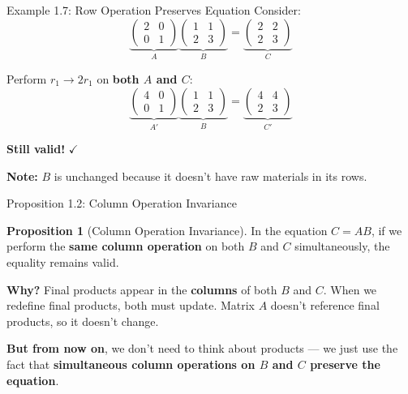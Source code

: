 \documentclass[10pt]{beamer}
\theoremstyle{definition}
\newtheorem{prop}{Proposition}[section]
\newcommand{\x}[1]{\alert{\textbf{#1}}}
\begin{document}
\begin{frame}{Example 1.7: Row Operation Preserves Equation}
Consider:
$$\underbrace{\begin{pmatrix} 2 & 0 \\ 0 & 1 \end{pmatrix}}_{A} \underbrace{\begin{pmatrix} 1 & 1 \\ 2 & 3 \end{pmatrix}}_{B} = \underbrace{\begin{pmatrix} 2 & 2 \\ 2 & 3 \end{pmatrix}}_{C}$$

Perform $r_1 \to 2r_1$ on \x{both $A$ and $C$}:
$$\underbrace{\begin{pmatrix} 4 & 0 \\ 0 & 1 \end{pmatrix}}_{A'} \underbrace{\begin{pmatrix} 1 & 1 \\ 2 & 3 \end{pmatrix}}_{B} = \underbrace{\begin{pmatrix} 4 & 4 \\ 2 & 3 \end{pmatrix}}_{C'}$$

\begin{center}
\Large \textbf{Still valid!} $\checkmark$
\end{center}

\vspace{0.3cm}
\textbf{Note:} $B$ is unchanged because it doesn't have raw materials in its rows.
\end{frame}

\begin{frame}{Proposition 1.2: Column Operation Invariance}
\begin{prop}[Column Operation Invariance]
In the equation $C = AB$, if we perform the \x{same column operation} on both $B$ and $C$ simultaneously, the equality remains valid.
\end{prop}

\vspace{0.3cm}
\textbf{Why?} Final products appear in the \x{columns} of both $B$ and $C$. When we redefine final products, both must update. Matrix $A$ doesn't reference final products, so it doesn't change.

\vspace{0.3cm}
\textbf{But from now on}, we don't need to think about products — we just use the fact that \x{simultaneous column operations on $B$ and $C$ preserve the equation}.
\end{frame}
\end{document}
